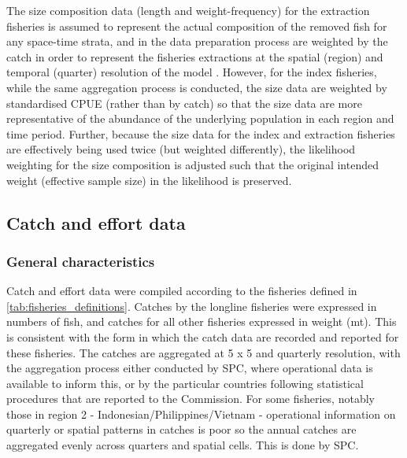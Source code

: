 The size composition data (length and weight-frequency) for the extraction fisheries is assumed to represent the actual composition of the removed fish for any space-time strata, and in the data preparation process are weighted by the catch in order to represent the fisheries extractions at the spatial (region) and temporal (quarter) resolution of the model \citep{peatman_analysis_2023}. However, for the index fisheries, while the same aggregation process is conducted, the size data are weighted by standardised CPUE (rather than by catch) so that the size data are more representative of the abundance of the underlying population in each region and time period. Further, because the size data for the index and extraction fisheries are effectively being used twice (but weighted differently), the likelihood weighting for the size composition is adjusted such that the original intended weight (effective sample size) in the likelihood is preserved.

\subsection{Catch and effort data}
\label{sec:catch_effort_data}

\subsubsection{General characteristics}

Catch and effort data were compiled according to the fisheries defined in \autoref{tab:fisheries_definitions}. Catches by the longline fisheries were expressed in numbers of fish, and catches for all other fisheries expressed in weight (mt). This is consistent with the form in which the catch data are recorded and reported for these fisheries. The catches are aggregated at 5\degree{} x 5\degree{} and quarterly resolution, with the aggregation process either conducted by SPC, where operational data is available to inform this, or by the particular countries following statistical procedures that are reported to the Commission. For some fisheries, notably those in region 2 - Indonesian/Philippines/Vietnam - operational information on quarterly or spatial patterns in catches is poor so the annual catches are aggregated evenly across quarters and spatial cells. This is done by SPC.

